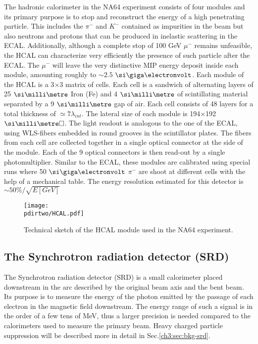 The hadronic calorimeter in the NA64 experiment consists of four modules and its primary purpose is to stop and reconstruct the energy of a high penetrating particle. This includes the $\pi^-$ and $K^-$ contained as impurities in the beam but also neutrons and protons that can be produced in inelastic scattering in the ECAL. Additionally, although a complete stop of 100 GeV $\mu^-$ remains unfeasible, the HCAL can characterize very efficiently the presence of such particle after the ECAL. The $\mu^-$ will leave the very distinctive MIP energy deposit inside each module, amounting roughly to $\sim 2.5$ $\gev$. Each module of the HCAL is a 3$\times$3 matrix of cells. Each cell is a sandwich of alternating layers of 25 $\mmi$ Iron (Fe) and 4 $\mmi$ of scintillating material separated by a 9 $\mmi$ gap of air. Each cell consists of 48 layers for a total thickness of $\simeq 7\lambda_{int}$. The lateral size of each module is 194$\times$192 $\mms$. The light readout is analogous to the one of the ECAL, using WLS-fibers embedded in round grooves in the scintillator plates. The fibers from each cell are collected together in a single optical connector at the side of the module. Each of the 9 optical connectors is then read-out by a single photomultiplier. Similar to the ECAL, these modules are calibrated using special runs where 50 $\gev$ $\pi^-$ are shoot at different cells with the help of a mechanical table. The energy resolution estimated for this detector is $\sim 50\%/\sqrt{E[GeV]}$

\begin{figure}[bth!]
\centering
\texttt{[image: \\pdirtwo/HCAL.pdf]}
\caption[HCAL sketch]{Technical sketch of the HCAL module used in the NA64 experiment.}
\label{fig:hcal-sketch}
\end{figure}

\subsection{The Synchrotron radiation detector (SRD)}
\label{ch2:sec:detectors-srd}

The Synchrotron radiation detector (SRD) is a small calorimeter placed downstream in the arc described by the original beam axis and the bent beam. Its purpose is to measure the energy of the photon emitted by the passage of each electron in the magnetic field downstream. The energy range of such a signal is in the order of a few tens of MeV, thus a larger precision is needed compared to the calorimeters used to measure the primary beam. Heavy charged particle suppression will be described more in detail in Sec.\ref{ch3:sec:bkg-srd}.

